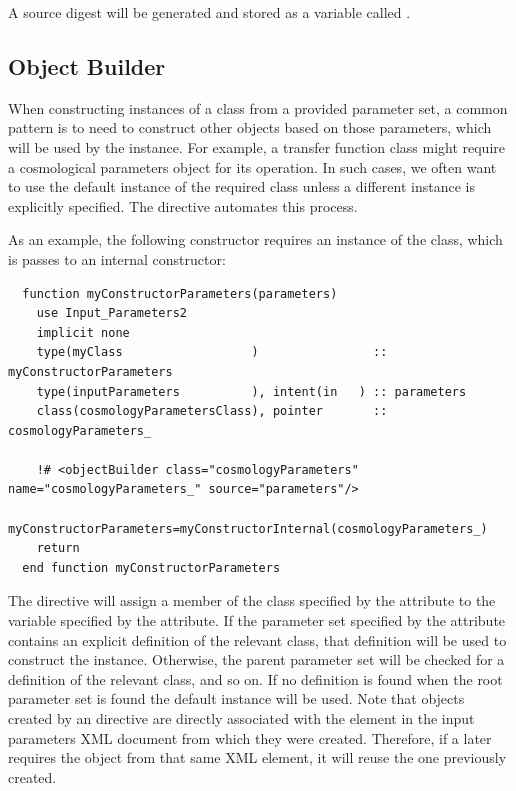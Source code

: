 A source digest will be generated and stored as a  variable called .

\subsection{Object Builder}

When constructing instances of a class from a provided parameter set, a common pattern is to need to construct other objects based on those parameters, which will be used by the instance. For example, a transfer function class might require a cosmological parameters object for its operation. In such cases, we often want to use the default instance of the required class unless a different instance is explicitly specified. The  directive automates this process.

As an example, the following constructor requires an instance of the  class, which is passes to an internal constructor:

\begin{lstlisting}  
  function myConstructorParameters(parameters)
    use Input_Parameters2
    implicit none
    type(myClass                  )                :: myConstructorParameters
    type(inputParameters          ), intent(in   ) :: parameters
    class(cosmologyParametersClass), pointer       :: cosmologyParameters_    

    !# <objectBuilder class="cosmologyParameters" name="cosmologyParameters_" source="parameters"/>
    myConstructorParameters=myConstructorInternal(cosmologyParameters_)
    return
  end function myConstructorParameters
\end{lstlisting}

The  directive will assign a member of the class specified by the  attribute to the variable specified by the  attribute. If the parameter set specified by the  attribute contains an explicit definition of the relevant class, that definition will be used to construct the instance. Otherwise, the parent parameter set will be checked for a definition of the relevant class, and so on. If no definition is found when the root parameter set is found the default instance will be used. Note that objects created by an  directive are directly associated with the element in the input parameters XML document from which they were created. Therefore, if a later  requires the object from that same XML element, it will reuse the one previously created.

